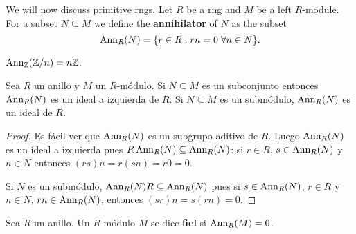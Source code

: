 %
%
%
%

We will now discuss primitive rngs. Let $R$ be a rng and $M$ be a left $R$-module. For a 
subset $N\subseteq M$
we define the \textbf{annihilator} of $N$ as the subset 
\[
\operatorname{Ann}_R(N)=\{r\in R:rn=0\;\forall n\in N\}.
\]

\begin{example}
	$\operatorname{Ann}_{\mathbb{Z}}(\mathbb{Z}/n)=n\mathbb{Z}$.
\end{example}

\begin{lemma}
	\label{lemma:Ann}
	Sea $R$ un anillo y $M$ un $R$-módulo. Si $N\subseteq M$ es un subconjunto
	entonces $\operatorname{Ann}_R(N)$ es un ideal a izquierda de $R$. Si $N\subseteq M$ es un
	submódulo, $\operatorname{Ann}_R(N)$ es un ideal de $R$.
\end{lemma}

\begin{proof}
	Es fácil ver que $\operatorname{Ann}_R(N)$ es un subgrupo aditivo de $R$. Luego $\operatorname{Ann}_R(N)$
	es un ideal a izquierda pues $R\operatorname{Ann}_R(N)\subseteq\operatorname{Ann}_R(N)$: si $r\in R$,
	$s\in\operatorname{Ann}_R(N)$ y $n\in N$ entonces $(rs)n=r(sn)=r0=0$. 
	
	Si $N$ es un submódulo, $\operatorname{Ann}_R(N)R\subseteq\operatorname{Ann}_R(N)$ pues si
	$s\in\operatorname{Ann}_R(N)$, $r\in R$ y $n\in N$, $rn\in\operatorname{Ann}_R(N)$, entonces
	$(sr)n=s(rn)=0$.
\end{proof}

\begin{definition}
	Sea $R$ un anillo. Un $R$-módulo $M$ se dice \textbf{fiel} si $\operatorname{Ann}_R(M)=0$. 
\end{definition}

